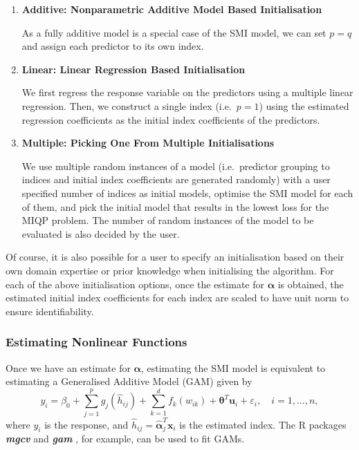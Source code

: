 \documentclass[
  11pt,
  a4paper,
]{article}
\begin{document}
\begin{enumerate}
  Now, the index structure and the index coefficients obtained through
  the above steps are considered to be a feasible initialisation for the
  proposed algorithm. Once the optimal SMI model is obtained through the
  algorithm, each index coefficient will be back-transformed to the
  original scale of the respective predictor variable, reversing the
  scaling effect applied at the beginning.
\item
  \textbf{Additive: Nonparametric Additive Model Based Initialisation}

  As a fully additive model is a special case of the SMI model, we can
  set \(p=q\) and assign each predictor to its own index.
\item
  \textbf{Linear: Linear Regression Based Initialisation}

  We first regress the response variable on the predictors using a
  multiple linear regression. Then, we construct a single index
  (i.e.~\(p = 1\)) using the estimated regression coefficients as the
  initial index coefficients of the predictors.
\item
  \textbf{Multiple: Picking One From Multiple Initialisations}

  We use multiple random instances of a model (i.e.~predictor grouping
  to indices and initial index coefficients are generated randomly) with
  a user specified number of indices as initial models, optimise the SMI
  model for each of them, and pick the initial model that results in the
  lowest loss for the MIQP problem. The number of random instances of
  the model to be evaluated is also decided by the user.
\end{enumerate}

Of course, it is also possible for a user to specify an initialisation
based on their own domain expertise or prior knowledge when initialising
the algorithm. For each of the above initialisation options, once the
estimate for \(\bm{\alpha}\) is obtained, the estimated initial index
coefficients for each index are scaled to have unit norm to ensure
identifiability.

\subsubsection{Estimating Nonlinear Functions}\label{sec-step2}

Once we have an estimate for \(\bm{\alpha}\), estimating the SMI model
is equivalent to estimating a Generalised Additive Model (GAM) given by
\[
  y_{i} = \beta_{0} + \sum_{j = 1}^{p}g_{j}(\hat{h}_{ij}) + \sum_{k = 1}^{d}f_{k}(w_{ik}) + \bm{\theta}^{T}\bm{u}_{i} + \varepsilon_{i}, \quad i = 1, \dots, n,
\] where \(y_{i}\) is the response, and
\(\hat{h}_{ij} = \hat{\bm{\alpha}}_{j}^{T}\bm{x}_{i}\) is the estimated
index. The R packages \textbf{\emph{mgcv}} \autocite{Wood2011} and
\textbf{\emph{gam}} \autocite{Hastie2023}, for example, can be used to
fit GAMs.
\end{document}
